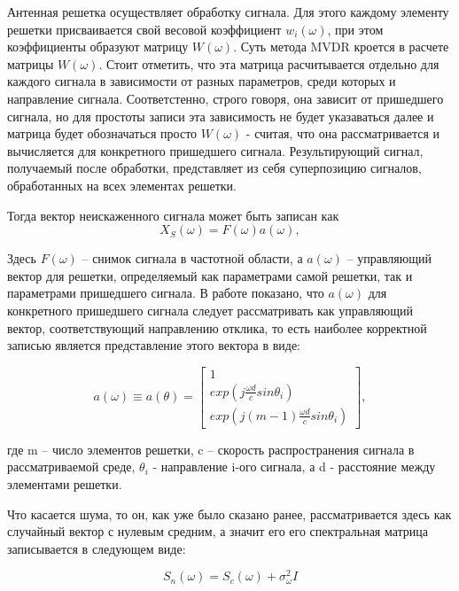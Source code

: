 \documentclass{article}
\begin{document}
Антенная решетка осуществляет обработку сигнала. Для этого каждому элементу решетки присваивается свой весовой коэффициент $w_i(\omega)$, при этом коэффициенты образуют матрицу $W(\omega)$. Суть метода MVDR кроется в расчете матрицы $W(\omega)$. Стоит отметить, что эта матрица расчитывается отдельно для каждого сигнала в зависимости от разных параметров, среди которых и направление сигнала. Соответстенно, строго говоря, она зависит от пришедшего сигнала, но для простоты записи эта зависимость не будет указаваться далее и матрица будет обозначаться просто $W(\omega)$ - считая, что она рассматривается и вычисляется для конкретного пришедшего сигнала. Результирующий сигнал, получаемый после обработки, представляет из себя суперпозицию сигналов, обработанных на всех элементах решетки.

Тогда вектор неискаженного сигнала может быть записан как
\begin{equation}
X_{S}(\omega) = F(\omega)a(\omega),
\end{equation}


Здесь $F(\omega)$ -- снимок сигнала в частотной области, а $a(\omega)$ -- управляющий вектор для решетки, определяемый как параметрами самой решетки, так и параметрами пришедшего сигнала. 
В работе \cite{Kiong2014} показано, что $a(\omega)$ для конкретного пришедшего сигнала следует рассматривать как управляющий вектор, соответствующий направлению отклика, то есть наиболее корректной записью является представление этого вектора в виде:

\begin{equation}
a(\omega) \equiv a(\theta) = \begin{bmatrix} 1 \\ exp(j \frac{\omega d}{c} sin\theta_i) \\ exp(j(m-1) \frac{\omega d}{c} sin\theta_i) \end{bmatrix},
\end{equation}

где m -- число элементов решетки, c -- скорость распространения сигнала в рассматриваемой среде, $\theta_i$ - направление i-ого сигнала, а d - расстояние между элементами решетки.

Что касается шума, то он, как уже было сказано ранее, рассматривается здесь как случайный вектор с нулевым средним, а значит его его спектральная матрица записывается в следующем виде:

\begin{equation}
S_n(\omega) = S_c(\omega) + \sigma_{\omega}^{2}I
\end{equation}
\end{document}
